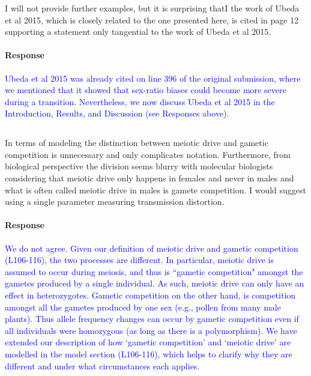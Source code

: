 \documentclass[10pt,letterpaper]{article}
\begin{document}
\noindent\subsubsection{}
I will not provide further examples, but it is surprising thatI the work of Ubeda et al 2015, which is closely related to the one presented here, is cited in page 12 supporting a statement only tangential to the work of Ubeda et al 2015.

\noindent\paragraph{Response}
\textcolor{blue}{Ubeda et al 2015 was already cited on line 396 of the original submission, where we mentioned that it showed that sex-ratio biases could become more severe during a transition.
Nevertheless, we now discuss Ubeda et al 2015 in the Introduction, Results, and Discussion (see Responses above).}

\noindent\subsection{}
In terms of modeling the distinction between meiotic drive and gametic competition is unnecessary and only complicates notation. Furthermore, from biological perspective the division seems blurry with molecular biologists considering that meiotic drive only happens in females and never in males and what is often called meiotic drive in males is gamete competition. I would suggest using a single parameter measuring transmission distortion.

\noindent\paragraph{Response}
\textcolor{blue}{We do not agree. 
Given our definition of meiotic drive and gametic competition (L106-116), the two processes are different.
In particular, meiotic drive is assumed to occur during meiosis, and thus is ``gametic competition" amongst the gametes produced by a single individual. 
As such, meiotic drive can only have an effect in heterozygotes.
Gametic competition on the other hand, is competition amongst all the gametes produced by one sex (e.g., pollen from many male plants).
Thus allele frequency changes can occur by gametic competition even if all individuals were homozygous (as long as there is a polymorphism).
We have extended our description of how `gametic competition' and `meiotic drive' are modelled in the model section (L106-116), which helps to clarify why they are different and under what circumstances each applies. 
}
\end{document}
